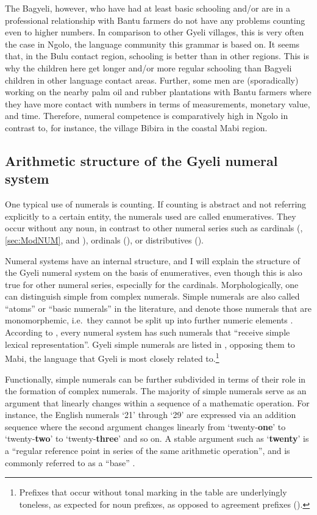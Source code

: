 The Bagyeli, however, who have had at least basic schooling and/or are in a professional relationship with Bantu farmers do not have any problems counting even to higher numbers. In comparison to other Gyeli villages, this is very often the case in Ngolo, the language community this grammar is based on. It seems that, in the Bulu contact region, schooling is better than in other regions. This is why the children here get longer and/or more regular schooling than Bagyeli children in other language contact areas. Further, some men are (sporadically) working on the nearby palm oil and rubber plantations with Bantu farmers where they have more contact with numbers in terms of measurements, monetary value, and time. Therefore, numeral competence is comparatively high in Ngolo in contrast to, for instance,  the village Bibira in the coastal Mabi region.



\subsection{Arithmetic structure of the Gyeli numeral system} One typical use of numerals is counting. If counting is abstract and not referring explicitly to a certain entity, the numerals used are called enumeratives. They occur without any noun, in contrast to other numeral series such as cardinals (, \ref{sec:ModNUM}, and ), ordinals (), or distributives ().

Numeral systems have an internal structure, and I will explain the structure of the Gyeli numeral system on the basis of enumeratives, even though this is also true for other numeral series, especially for the cardinals. Morphologically,  one can distinguish simple from complex numerals. Simple numerals are also called ``atoms'' or ``basic numerals'' in the literature, and  denote those numerals that are monomorphemic, i.e.~they cannot be split up into further numeric elements \citep[25]{borchardt11}. According to \citet[255]{greenberg78}, every numeral system has such numerals that ``receive simple lexical representation''. Gyeli simple numerals are listed in , opposing them to Mabi, the language that Gyeli is most closely related to.\footnote{Prefixes that occur without tonal marking in the table are underlyingly toneless, as expected for noun prefixes, as opposed to agreement prefixes ().} 

Functionally, simple numerals can be further subdivided  in terms of their role in the formation of complex numerals. The majority of simple numerals serve as an argument that linearly changes within a sequence of a mathematic operation. For instance, the English numerals `21' through `29' are expressed via an addition sequence where the second argument changes linearly from `twenty-{\bfseries one}' to `twenty-{\bfseries two}' to `twenty-{\bfseries three}' and so on. A stable argument such as `{\bfseries twenty}'  is a ``regular reference point in series of the same arithmetic operation'', and is commonly referred to as a ``base'' \citep[23]{borchardt11}. 

